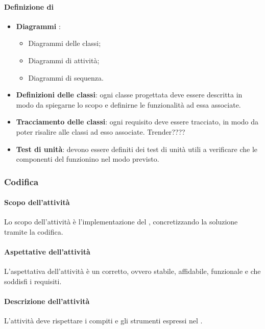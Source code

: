  \paragraph{Definizione di }
\begin{itemize}
	\item \textbf{Diagrammi }:
	\begin{itemize}
		\item Diagrammi delle classi;
		\item Diagrammi di attività;
		\item Diagrammi di sequenza.
	\end{itemize}
	\item \textbf{Definizioni delle classi}: ogni classe progettata deve essere descritta in modo da spiegarne lo scopo e definirne le
funzionalità ad essa associate.
	\item \textbf{Tracciamento delle classi}: ogni requisito deve essere tracciato, in modo da poter risalire alle classi ad esso associate. Trender????
	\item \textbf{Test di unità}: devono essere definiti dei test di unità utili a verificare che le componenti del 
funzionino nel modo previsto.
\end{itemize}

\subsubsection{Codifica}
 \paragraph{Scopo dell'attività}
 Lo scopo dell'attività è l'implementazione del , concretizzando la soluzione tramite la codifica.  
 \paragraph{Aspettative dell'attività}
 L'aspettativa dell'attività è un  corretto, ovvero stabile, affidabile, funzionale e che soddisfi i requisiti. 
 \paragraph{Descrizione dell'attività}
 L'attività deve rispettare i compiti e gli strumenti espressi nel \PPdocRR.
